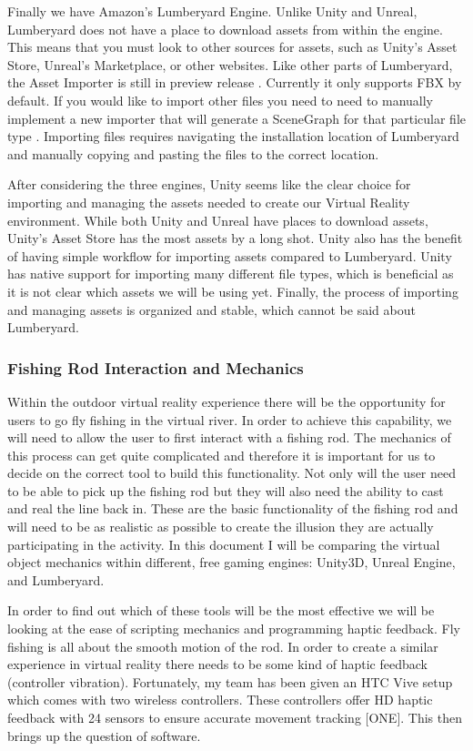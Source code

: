 \documentclass[10pt,journal,compsoc,onecolumn, draftclsnofoot]{IEEEtran}
\begin{document}
Finally we have Amazon's Lumberyard Engine.
Unlike Unity and Unreal, Lumberyard does not have a place to download assets from within the engine.
This means that you must look to other sources for assets, such as Unity's Asset Store, Unreal's Marketplace, or other websites.
Like other parts of Lumberyard, the Asset Importer is still in preview release \cite{lumberyard_asset_import}.
Currently it only supports FBX by default.
If you would like to import other files you need to need to manually implement a new importer that will generate a SceneGraph for that particular file type \cite{lumberyard_asset_import}.
Importing files requires navigating the installation location of Lumberyard and manually copying and pasting the files to the correct location.

After considering the three engines, Unity seems like the clear choice for importing and managing the assets needed to create our Virtual Reality environment.
While both Unity and Unreal have places to download assets, Unity's Asset Store has the most assets by a long shot.
Unity also has the benefit of having simple workflow for importing assets compared to Lumberyard.
Unity has native support for importing many different file types, which is beneficial as it is not clear which assets we will be using yet.
Finally, the process of importing and managing assets is organized and stable, which cannot be said about Lumberyard.

\subsubsection{Fishing Rod Interaction and Mechanics}
Within the outdoor virtual reality experience there will be the opportunity for users to go fly fishing in the virtual river.
In order to achieve this capability, we will need to allow the user to first interact with a fishing rod.
The mechanics of this process can get quite complicated and therefore it is important for us to decide on the correct tool to build this functionality.
Not only will the user need to be able to pick up the fishing rod but they will also need the ability to cast and real the line back in.
These are the basic functionality of the fishing rod and will need to be as realistic as possible to create the illusion they are actually participating in the activity.
In this document I will be comparing the virtual object mechanics within different, free gaming engines: Unity3D, Unreal Engine, and Lumberyard.

In order to find out which of these tools will be the most effective we will be looking at the ease of scripting mechanics and programming haptic feedback.
Fly fishing is all about the smooth motion of the rod.
In order to create a similar experience in virtual reality there needs to be some kind of haptic feedback (controller vibration).
Fortunately, my team has been given an HTC Vive setup which comes with two wireless controllers.
These controllers offer HD haptic feedback with 24 sensors to ensure accurate movement tracking [ONE].
This then brings up the question of software.
\end{document}
